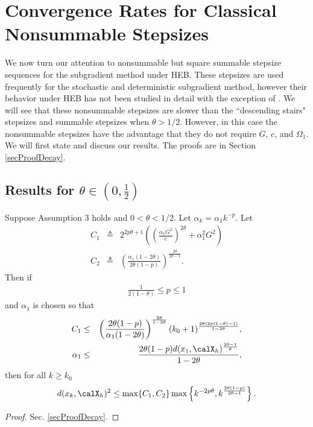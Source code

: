 \section{Convergence Rates for Classical Nonsummable Stepsizes}\label{Sec_decay}
We now turn our attention to nonsummable but square summable stepsize sequences for the subgradient method under HEB. These stepsizes are used frequently for the stochastic and deterministic subgradient method, however their behavior under HEB has not been studied in detail with the exception of \cite{lim2011convergence,supittayapornpong2016staggered}. We will see that these nonsummable stepsizes are slower than the ``descending stairs" stepsizes and summable stepsizes when $\theta> 1/2$. However, in this case the nonsummable stepsizes have the advantage that they do not require $G$, $c$, and $\Omega_1$. We will first state and discuss our results. The proofs are in Section \ref{secProofDecay}. 
\subsection{Results for $\theta\in(0,\frac{1}{2})$}

\begin{theorem}\label{thmDimSum}
Suppose Assumption 3 holds and $0<\theta<1/2$. Let $\alpha_k = \alpha_1 k^{-p}$. Let
\begin{eqnarray}
C_1 &\triangleq& \label{C1Def}
2^{2p\theta+1}
\left(
\left(\frac{\alpha_1 G^2}{c}\right)^{2\theta}
+
\alpha_1^2 G^2
\right)
\\\nonumber
C_2
&\triangleq&
\left(\frac{\alpha_1(1-2\theta)}{2\theta(1-p)}\right)^{\frac{2\theta}{2\theta-1}}.
\end{eqnarray}
Then if
\begin{eqnarray}\label{dcond}
\frac{1}{2(1-\theta)}\leq p\leq 1
\end{eqnarray}
and $\alpha_1$ is chosen so that
\begin{eqnarray}
C_1
&\leq&
\left(\frac{2\theta(1-p)}{\alpha_1(1-2\theta)}\right)^{\frac{2\theta}{1-2\theta}}
(k_0+1)
^{\frac{2\theta(2p(1-\theta)-1)}{1-2\theta}}\label{cc},
\\
\alpha_1
&\leq&
\frac{2\theta(1-p)d(x_1,\calX_h)^{\frac{2\theta-1}{\theta}}}{1-2\theta}
,
\label{cc2}
\end{eqnarray}
then for all $k\geq k_0$
\begin{eqnarray}\label{lowTheta1}
d(x_k,\calX_h)^2
\leq
\max\{C_1,C_2\}
\max\left\{
k^{-2p\theta},
k^{\frac{2\theta(1-p)}{2\theta-1}}
\right\}.
\end{eqnarray}


\end{theorem}
\begin{proof}
Sec. \ref{secProofDecay}.
\end{proof}
\begin{comment}
\begin{eqnarray}\label{lowTheta1}
d(x_k,\calX_h)^2
\leq
\max\left\{
C_1 k^{-2d\theta},
C_3
\left(
\frac{1}{2}+C_2k^{1-d}
\right)^{\frac{2\theta}{2\theta-1}}
\right\}.
\end{eqnarray}
\end{comment}

